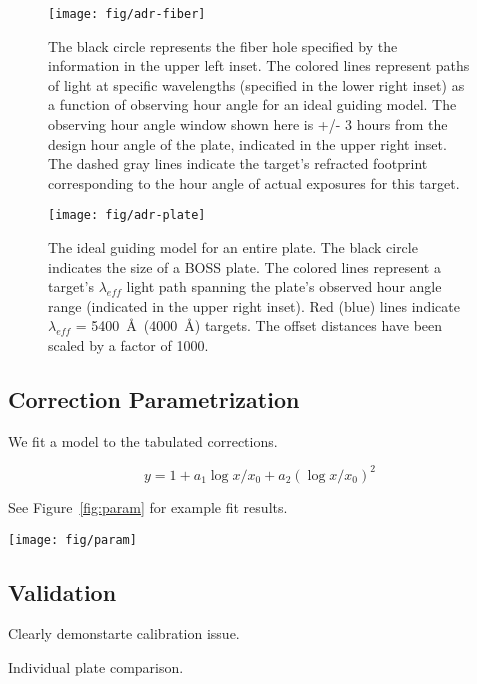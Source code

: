 \documentclass[preprint2]{aastex}
\providecommand{\fig}[1]{Figure~\ref{fig:#1}}
\begin{document}
\begin{figure}
\centering
\texttt{[image: fig/adr-fiber]}
\caption{The black circle represents the fiber hole specified by the information in the upper left inset. The colored lines represent paths of light at specific wavelengths (specified in the lower right inset) as a function of observing hour angle for an ideal guiding model. The observing hour angle window shown here is +/- 3 hours from the design hour angle of the plate, indicated in the upper right inset. The dashed gray lines indicate the target's refracted footprint corresponding to the hour angle of actual exposures for this target.}
\label{fig:fiber_hole}
\end{figure}

\begin{figure}
\centering
\texttt{[image: fig/adr-plate]}
\caption{The ideal guiding model for an entire plate. The black circle indicates the size of a BOSS plate. The colored lines represent a target's $\lambda_{eff}$ light path spanning the plate's observed hour angle range (indicated in the upper right inset). Red (blue) lines indicate $\lambda_{eff}$ = 5400~\AA~(4000~\AA) targets. The offset distances have been scaled by a factor of 1000.}
\label{fig:plate_guide}
\end{figure}

\subsection{Correction Parametrization}

We fit a model to the tabulated corrections.

\begin{equation}
y = 1 + a_1 \log x/x_0 + a_2 (\log x/x_0)^2
\end{equation}

See \fig{param} for example fit results.

\begin{figure*}
\centering
\texttt{[image: fig/param]}
\caption{Example parametrization fit results.}
\label{fig:param}
\end{figure*}

\subsection{Validation}

Clearly demonstarte calibration issue. 

Individual plate comparison.
\end{document}
